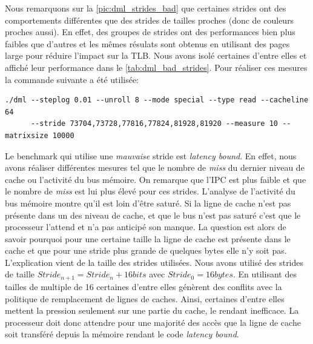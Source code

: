         Nous remarquons sur la \autoref{pic:dml_strides_bad} que certaines strides ont des comportements différentes que des strides de tailles proches (donc de couleurs proches aussi). En effet, des groupes de strides ont des performances bien plus faibles que d'autres et les mêmes résulats sont obtenus en utilisant des pages large pour réduire l'impact sur la TLB. Nous avons isolé certaines d'entre elles et affiché leur performance dans le  \autoref{tab:dml_bad_strides}. Pour réaliser ces mesures la commande suivante a été utilisée: 
        \begin{verbatim}
./dml --steplog 0.01 --unroll 8 --mode special --type read --cacheline 64 
      --stride 73704,73728,77816,77824,81928,81920 --measure 10 --matrixsize 10000
        \end{verbatim}
        
        Le benchmark qui utilise une \textit{mauvaise} stride est \textit{latency bound}. En effet, nous avons réaliser différentes mesures tel que le nombre de \textit{miss} du dernier niveau de cache ou l'activité du bus mémoire. On remarque que l'IPC est plus faible et que le nombre de \textit{miss} est lui plus élevé pour ces strides. L'analyse de l'activité du bus mémoire montre qu'il est loin d'être saturé. Si la ligne de cache n'est pas présente dans un des niveau de cache, et que le bus n'est pas saturé c'est que le processeur l'attend et n'a pas anticipé son manque. La question est alors de savoir pourquoi pour une certaine taille la ligne de cache est présente dans le cache et que pour une stride plus grande de quelques bytes elle n'y soit pas. L'explication vient de la taille des strides utilisées. Nous avons utilisé des strides de taille $ Stride_{n+1} = Stride_n + 16 bits$ avec $Stride_0 = 16 bytes$. En utilisant des tailles de multiple de 16 certaines d'entre elles génèrent des conflits avec la politique de remplacement de lignes de caches. Ainsi, certaines d'entre elles mettent la pression seulement sur une partie du cache, le rendant inefficace. La processeur doit donc attendre pour une majorité des accès que la ligne de cache soit transféré depuis la mémoire rendant le code \textit{latency bound}.
        
        
        
  
        
        
        
